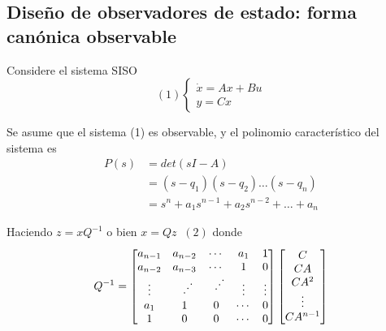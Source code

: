 \subsection{Diseño de observadores de estado: forma canónica observable}

Considere el sistema SISO
\[(1)
    \left\{
        \begin{array}{lll}
            \dot{x} = Ax + Bu \\
            y = Cx
        \end{array}
    \right.
\]

Se asume que el sistema (1) es observable, y el polinomio característico del sistema es 
\[
    \begin{split}
        P(s) & = det(sI-A) \\
        & = (s-q_{1}) ( s-q_{2}) \ldots (s-q_{n}) \\
        & = s^{n} + a_{1}s^{n-1} + a_{2}s^{n-2} + \ldots + a_{n}
    \end{split}
\]

Haciendo \( z=xQ^{-1} \) o bien \( x=Qz \;\; (2) \) donde 
\[
    Q^{-1} =
    \begin{bmatrix}
    a_{n-1} & a_{n-2} & \cdots & a_{1} & 1 \\
    a_{n-2} & a_{n-3} & \cdots & 1 & 0 \\
    \vdots & \rotatebox{90}{\(\ddots\)} & \rotatebox{90}{ \(\ddots\) } & \vdots & \vdots\\
    a_{1} & 1 & 0 & \cdots & 0 \\
    1 & 0 & 0 & \cdots & 0
    \end{bmatrix}
    \begin{bmatrix}
        C \\ CA \\ CA^{2} \\ \vdots \\ CA^{n-1}
    \end{bmatrix}
\]

